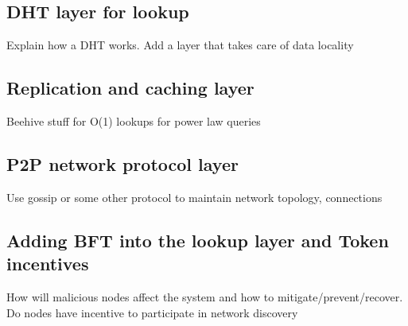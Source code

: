 \subsection{DHT layer for lookup}
Explain how a DHT works. Add a layer that takes care of data locality

\subsection{Replication and caching layer}
Beehive stuff for O(1) lookups for power law queries

\subsection{P2P network protocol layer}
Use gossip or some other protocol to maintain network topology, connections

\subsection{Adding BFT into the lookup layer and Token incentives}
How will malicious nodes affect the system and how to mitigate/prevent/recover. Do nodes have incentive to participate in network discovery